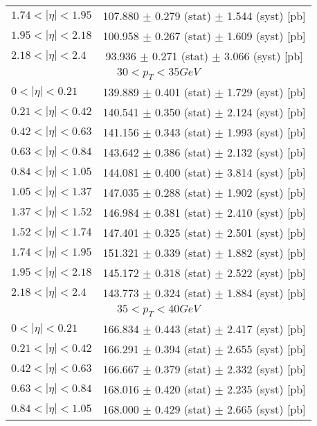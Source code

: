 \begin{tabular}{lc}
$1.74 < |\eta| <1.95$          & 107.880 $\pm$ 0.279 (stat) $\pm$ 1.544 (syst) [pb]  \\
$1.95 < |\eta| <2.18$          & 100.958 $\pm$ 0.267 (stat) $\pm$ 1.609 (syst) [pb]  \\
$2.18 < |\eta| <2.4$           & 93.936 $\pm$ 0.271 (stat) $\pm$ 3.066 (syst) [pb]  \\
\hline
\multicolumn{2}{c}{$30 < p_{T} < 35 GeV$} \\
\hline
$0 < |\eta| <0.21$             & 139.889 $\pm$ 0.401 (stat) $\pm$ 1.729 (syst) [pb]  \\
$0.21 < |\eta| <0.42$          & 140.541 $\pm$ 0.350 (stat) $\pm$ 2.124 (syst) [pb]  \\
$0.42 < |\eta| <0.63$          & 141.156 $\pm$ 0.343 (stat) $\pm$ 1.993 (syst) [pb]  \\
$0.63 < |\eta| <0.84$          & 143.642 $\pm$ 0.386 (stat) $\pm$ 2.132 (syst) [pb]  \\
$0.84 < |\eta| <1.05$          & 144.081 $\pm$ 0.400 (stat) $\pm$ 3.814 (syst) [pb]  \\
$1.05 < |\eta| <1.37$          & 147.035 $\pm$ 0.288 (stat) $\pm$ 1.902 (syst) [pb]  \\
$1.37 < |\eta| <1.52$          & 146.984 $\pm$ 0.381 (stat) $\pm$ 2.410 (syst) [pb]  \\
$1.52 < |\eta| <1.74$          & 147.401 $\pm$ 0.325 (stat) $\pm$ 2.501 (syst) [pb]  \\
$1.74 < |\eta| <1.95$          & 151.321 $\pm$ 0.339 (stat) $\pm$ 1.882 (syst) [pb]  \\
$1.95 < |\eta| <2.18$          & 145.172 $\pm$ 0.318 (stat) $\pm$ 2.522 (syst) [pb]  \\
$2.18 < |\eta| <2.4$           & 143.773 $\pm$ 0.324 (stat) $\pm$ 1.884 (syst) [pb]  \\
\hline
\multicolumn{2}{c}{$35 < p_{T} < 40 GeV$} \\
\hline
$0 < |\eta| <0.21$             & 166.834 $\pm$ 0.443 (stat) $\pm$ 2.417 (syst) [pb]  \\
$0.21 < |\eta| <0.42$          & 166.291 $\pm$ 0.394 (stat) $\pm$ 2.655 (syst) [pb]  \\
$0.42 < |\eta| <0.63$          & 166.667 $\pm$ 0.379 (stat) $\pm$ 2.332 (syst) [pb]  \\
$0.63 < |\eta| <0.84$          & 168.016 $\pm$ 0.420 (stat) $\pm$ 2.235 (syst) [pb]  \\
$0.84 < |\eta| <1.05$          & 168.000 $\pm$ 0.429 (stat) $\pm$ 2.665 (syst) [pb]  \\

\end{tabular}
